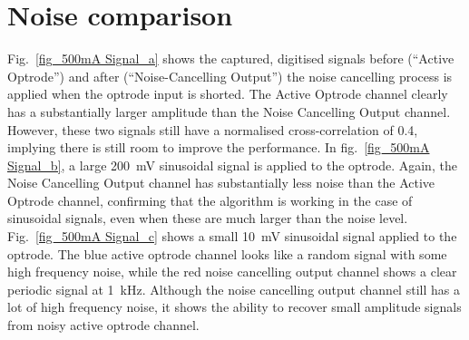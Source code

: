 \section{Noise comparison}

Fig.~\ref{fig_500mA Signal_a} shows the captured, digitised signals before (``Active Optrode'') and after (``Noise-Cancelling Output'') the noise cancelling process is applied when the optrode input is shorted.  The Active Optrode channel clearly has a substantially larger amplitude than the Noise Cancelling Output channel.  However, these two signals still have a normalised cross-correlation of 0.4, implying there is still room to improve the performance. In fig.~\ref{fig_500mA Signal_b}, a large \qty{200}{mV} sinusoidal signal is applied to the optrode.  Again, the Noise Cancelling Output channel has substantially less noise than the Active Optrode channel, confirming that the algorithm is working in the case of sinusoidal signals, even when these are much larger than the noise level.  Fig.~\ref{fig_500mA Signal_c} shows a small \qty{10}{mV} sinusoidal signal applied to the optrode.  The blue active optrode channel looks like a random signal with some high frequency noise, while the red noise cancelling output channel shows a clear periodic signal at \qty{1}{kHz}.  Although the noise cancelling output channel still has a lot of high frequency noise, it shows the ability to recover small amplitude signals from noisy active optrode channel.

